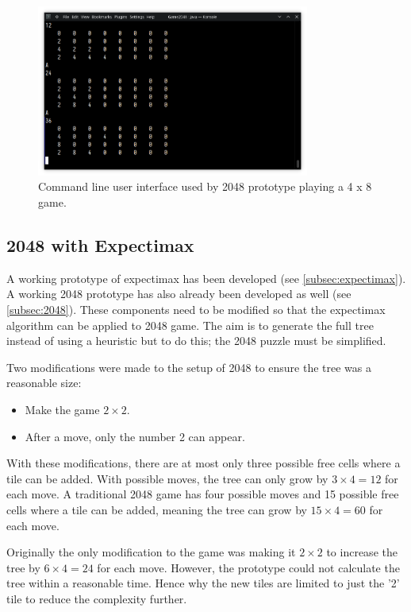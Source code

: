 \documentclass{article}
\begin{document}
    \begin{figure}
        \centering
        \includegraphics[width=0.8\textwidth]{Screenshot_20221201_231121.png}
        \caption{Command line user interface used by 2048 prototype playing a 4 x 8 game.}
        \label{fig:2048_cli}
    \end{figure}
\subsection{2048 with Expectimax}
\label{subsec:2048_expectimax}
A working prototype of expectimax has been developed (see \ref{subsec:expectimax}). A working 2048 prototype has also already been developed as well (see \ref{subsec:2048}).  These components need to be modified so that the expectimax algorithm can be applied to 2048 game. 
The aim is to generate the full tree instead of using a heuristic but to do this; the 2048 puzzle must be simplified.

Two modifications were made to the setup of 2048 to ensure the tree was a reasonable size:
\begin{itemize}
    \item Make the game $2 \times 2$.
    \item After a move, only the number 2 can appear.
\end{itemize}
With these modifications, there are at most only three possible free cells where a tile can be added. With possible moves, the tree can only grow by $3 \times 4 = 12$ for each move.
A traditional 2048 game has four possible moves and 15 possible free cells where a tile can be added, meaning the tree can grow by $15 \times 4 = 60$ for each move.

Originally the only modification to the game was making it $2 \times 2$ to increase the tree by $6 \times 4 = 24$ for each move. However, the prototype could not calculate the tree within a reasonable time. Hence why the new tiles are limited to just the '2' tile to reduce the complexity further.
\end{document}
